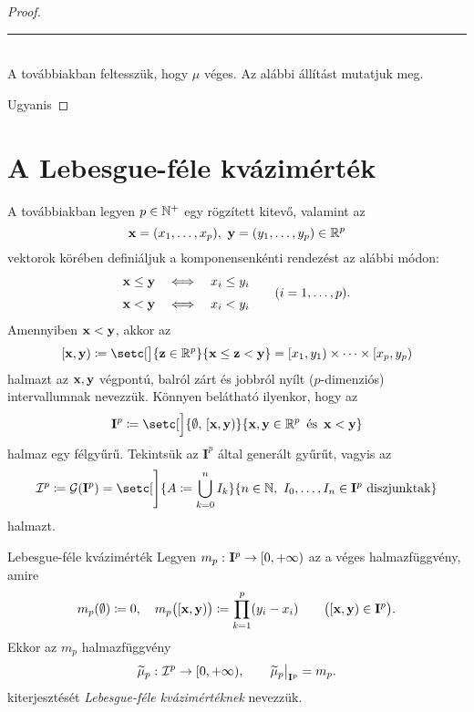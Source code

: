 \documentclass[
]{elteikthesis}[2024/04/26]
\begin{document}
\begin{proof}
		\noindent\rule{\linewidth}{0.4pt}\\
		
		A továbbiakban feltesszük, hogy \( \mu \) véges. Az alábbi állítást mutatjuk meg.
		
		\fbox{\ref{eq:kvázimérték-jellemzése-04} \( \Longrightarrow \)
			  \ref{eq:kvázimérték-jellemzése-02}}
		Ugyanis
		
	\end{proof}
	
	\newpage
	\section{A Lebesgue-féle kvázimérték}
	
	A továbbiakban legyen \( p \in \mathbb{N}^+ \) egy rögzített kitevő, valamint az
	\[
		\vb{x} = (x_1, \dots, x_p), \ \vb{y} = (y_1, \dots, y_p) \in \mathbb{R}^p
	\]
	vektorok körében definiáljuk a komponensenkénti rendezést az alábbi módon:
	\[
		\begin{alignedat}{3}
			\x &\leq \y \quad &&\ratio \Longleftrightarrow \quad x_i &&\leq y_i \\[3pt]
			\x &<    \y \quad &&\ratio \Longleftrightarrow \quad x_i &&<    y_i
		\end{alignedat}
		\qquad (i = 1,\dots, p).
	\]
	Amennyiben \( \vb{x} < \vb{y} \), akkor az
	\[
		[\x, \y) \coloneq 
		\setc[\big]{ \vb{z} \in \R^p }{ \x \leq \vb{z} < \y } =
		[ x_1, y_1 ) \times \cdots \times [x_p, y_p )
	\]
	halmazt az \( \vb{x}, \vb{y} \) végpontú, balról zárt és jobbról nyílt (\( p \)-dimenziós) intervallumnak nevezzük. Könnyen belátható ilyenkor, hogy az
	\[
		\mathbf{I}^p \coloneq 
		\setc[\Big]{ \emptyset,\, [\x, \y) }{ \x, \y \in \R^p \,\text{ és }\, \x < \y }
	\]
	halmaz egy félgyűrű. Tekintsük az \( \mathbf{I}^p \) által generált gyűrűt, vagyis az
	\[
		\mathcal{I}^p \coloneq 
		\mathcal{G}( \mathbf{I}^p ) =
		\setc[\Bigg]{ A \coloneq \bigcup_{k=0}^n I_k }{ n \in \N, \ I_0, \dots, I_n \in \mathbf{I}^p \ \text{diszjunktak} }
	\]
	halmazt.
	
	\begin{definition}{Lebesgue-féle kvázimérték}{}
		Legyen \( m_p  \,\colon  \mathbf{I}^p  \to [0, +\infty) \) az a véges halmazfüggvény, amire
		\[
			m_p( \emptyset ) \coloneq 0, \quad
			m_p \bigl( [\vb{x}, \vb{y}) \bigr) \coloneq \prod_{k=1}^{p} (y_i - x_i) 
			\qquad \bigl( [\vb{x}, \vb{y}) \in \mathbf{I}^p \bigr).
		\]
		Ekkor az \( m_p \) halmazfüggvény
		\[
			\func{ \widetilde{\mu}_p }{ \mathcal{I}^p }{[0, +\infty)}, \qquad
			\restr{ \widetilde{\mu}_p }{ \mathbf{I}^p } = m_p.
		\]
		kiterjesztését \emph{Lebesgue-féle kvázimértéknek} nevezzük.
	\end{definition}
	
\end{document}
